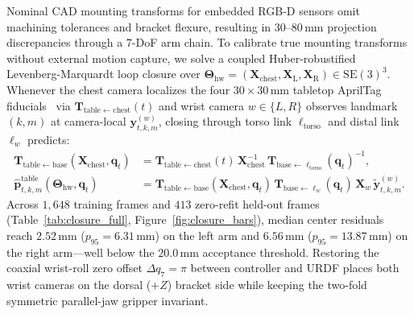 \documentclass{evidencescene}
\begin{document}
Nominal CAD mounting transforms for embedded RGB-D sensors omit machining tolerances and bracket flexure, resulting in $30$--$80\,\mathrm{mm}$ projection discrepancies through a 7-DoF arm chain. To calibrate true mounting transforms without external motion capture, we solve a coupled Huber-robustified Levenberg-Marquardt loop closure over $\boldsymbol{\Theta}_{\mathrm{hw}} = (\mathbf{X}_{\mathrm{chest}}, \mathbf{X}_{\mathrm{L}}, \mathbf{X}_{\mathrm{R}}) \in \mathrm{SE}(3)^3$. Whenever the chest camera localizes the four $30\times 30\,\mathrm{mm}$ tabletop AprilTag fiducials~\cite{krogius2019apriltag3} via $\mathbf{T}_{\mathrm{table}\leftarrow \mathrm{chest}}(t)$ and wrist camera $w \in \{L, R\}$ observes landmark $(k,m)$ at camera-local $\mathbf{y}_{t,k,m}^{(w)}$, closing through torso link $\ell_{\mathrm{torso}}$ and distal link $\ell_w$ predicts:
\begin{equation}
\begin{aligned}
    \mathbf{T}_{\mathrm{table}\leftarrow \mathrm{base}}(\mathbf{X}_{\mathrm{chest}}, \mathbf{q}_t) &= \mathbf{T}_{\mathrm{table}\leftarrow \mathrm{chest}}(t)\,\mathbf{X}_{\mathrm{chest}}^{-1}\,\mathbf{T}_{\mathrm{base}\leftarrow \ell_{\mathrm{torso}}}(\mathbf{q}_t)^{-1}, \\
    \hat{\mathbf{p}}_{t,k,m}^{\mathrm{table}}(\boldsymbol{\Theta}_{\mathrm{hw}}, \mathbf{q}_t) &= \mathbf{T}_{\mathrm{table}\leftarrow \mathrm{base}}(\mathbf{X}_{\mathrm{chest}}, \mathbf{q}_t)\,\mathbf{T}_{\mathrm{base}\leftarrow \ell_w}(\mathbf{q}_t)\,\mathbf{X}_w\,\tilde{\mathbf{y}}_{t,k,m}^{(w)}.
\end{aligned}
\end{equation}
Across $1{,}648$ training frames and $413$ zero-refit held-out frames (Table~\ref{tab:closure_full}, Figure~\ref{fig:closure_bars}), median center residuals reach $2.52\,\mathrm{mm}$ ($p_{95}=6.31\,\mathrm{mm}$) on the left arm and $6.56\,\mathrm{mm}$ ($p_{95}=13.87\,\mathrm{mm}$) on the right arm---well below the $20.0\,\mathrm{mm}$ acceptance threshold. Restoring the coaxial wrist-roll zero offset $\Delta q_7=\pi$ between controller and URDF places both wrist cameras on the dorsal ($+Z$) bracket side while keeping the two-fold symmetric parallel-jaw gripper invariant.
\end{document}
